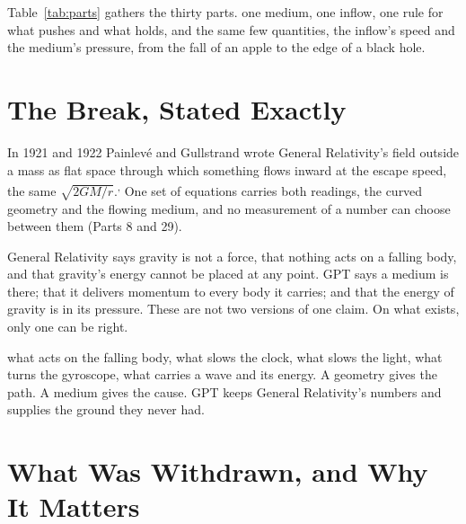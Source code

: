 \documentclass[11pt,a4paper]{article}
\begin{document}
Table~\ref{tab:parts} gathers the thirty parts.  one medium, one inflow, one rule for what pushes and what holds, and the same few quantities, the inflow's speed and the medium's pressure, from the fall of an apple to the edge of a black hole.

\section{The Break, Stated Exactly}

 In 1921 and 1922 Painlevé and Gullstrand wrote General Relativity's field outside a mass as flat space through which something flows inward at the escape speed, the same $\sqrt{2GM/r}$.\textsuperscript{,} One set of equations carries both readings, the curved geometry and the flowing medium, and no measurement of a number can choose between them (Parts 8 and 29).

 General Relativity says gravity is not a force, that nothing acts on a falling body, and that gravity's energy cannot be placed at any point. GPT says a medium is there; that it delivers momentum to every body it carries; and that the energy of gravity is in its pressure. These are not two versions of one claim. On what exists, only one can be right.

 what acts on the falling body, what slows the clock, what slows the light, what turns the gyroscope, what carries a wave and its energy. A geometry gives the path. A medium gives the cause. GPT keeps General Relativity's numbers and supplies the ground they never had.

\section{What Was Withdrawn, and Why It Matters}
\end{document}
